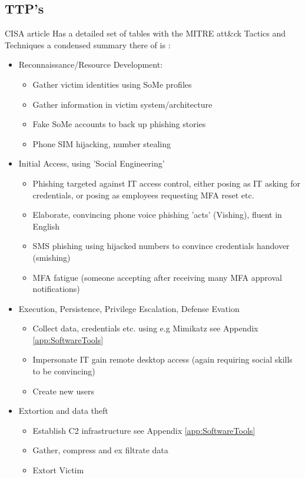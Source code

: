 \documentclass[
	letterpaper, %
	10pt, %
	unnumberedsections, %
	twoside, %
]{APAAssignment}
\begin{document}
\subsection{TTP's}
CISA article \cite{CISA_ScattetedSpider} Has a detailed set of tables with the MITRE att\&ck Tactics and Techniques a condensed summary there of is :
\begin{itemize}
	\item Reconnaissance/Resource Development:
	      \begin{itemize}
		      \item Gather victim identities using SoMe profiles
		      \item Gather information in victim system/architecture
		      \item Fake SoMe accounts to back up phishing stories
		      \item Phone SIM hijacking, number stealing
	      \end{itemize}
	\item Initial Access, using 'Social Engineering'
	      \begin{itemize}
		      \item Phishing targeted against IT access control, either posing as IT asking for credentials, or posing as employees requesting MFA reset etc.
		      \item Elaborate, convincing phone voice phishing 'acts' (Vishing), fluent in English
		      \item SMS phishing using hijacked numbers to convince credentials handover (smishing)
		      \item MFA fatigue (someone accepting after receiving many MFA approval notifications)
	      \end{itemize}
	\item Execution, Persistence, Privilege Escalation, Defense Evation
	      \begin{itemize}
		      \item Collect data, credentials etc. using e.g Mimikatz see Appendix \ref{app:SoftwareTools}
		      \item Impersonate IT gain remote desktop access (again requiring social skills to be convincing)
		      \item Create new users
	      \end{itemize}
	\item Extortion and data theft
	      \begin{itemize}
		      \item Establish C2 infrastructure see Appendix \ref{app:SoftwareTools}
		      \item Gather, compress and ex filtrate data
		      \item Extort Victim
	      \end{itemize}
\end{itemize}
\end{document}
